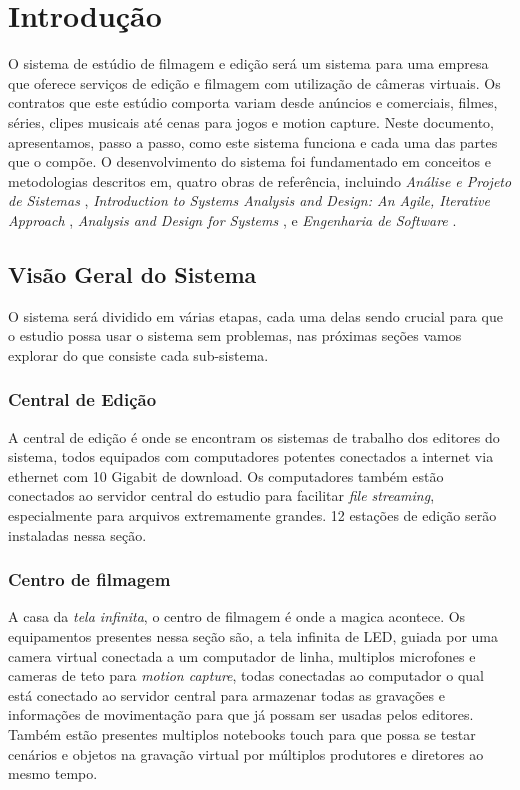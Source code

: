 
\chapter{Introdu\c{c}\~{a}o}

O sistema de estúdio de filmagem e edição será um sistema para uma empresa que oferece serviços de edição e filmagem com utilização de câmeras virtuais. Os contratos que este estúdio comporta variam desde anúncios e comerciais, filmes, séries, clipes musicais até cenas para jogos e motion capture. Neste documento, apresentamos, passo a passo, como este sistema funciona e cada uma das partes que o compõe. O desenvolvimento do sistema foi fundamentado em conceitos e metodologias descritos em, quatro obras de referência, incluindo \textit{Análise e Projeto de Sistemas} \cite{Dennis2014}, \textit{Introduction to Systems Analysis and Design: An Agile, Iterative Approach} \cite{Satzinger2012}, \textit{Analysis and Design for Systems} \cite{Shelly2012}, e \textit{Engenharia de Software} \cite{Sommerville2011}.

\section{Visão Geral do Sistema}
O sistema será dividido em várias etapas, cada uma delas sendo crucial para que o estudio possa usar o sistema sem problemas, nas próximas seções vamos explorar do que consiste cada sub-sistema.
  \subsection{Central de Edição}
  A central de edição é onde se encontram os sistemas de trabalho dos editores do sistema, todos equipados com computadores potentes conectados a internet via ethernet com 10 Gigabit de download. Os computadores também estão conectados ao servidor central do estudio para facilitar \textit{file streaming}, especialmente para arquivos extremamente grandes. 12 estações de edição serão instaladas nessa seção.
  \subsection{Centro de filmagem}
  A casa da \textit{tela infinita}, o centro de filmagem é onde a magica acontece. Os equipamentos presentes nessa seção são, a tela infinita de LED, guiada por uma camera virtual conectada a um computador de linha, multiplos microfones e cameras de teto para \textit{motion capture}, todas conectadas ao computador o qual está conectado ao servidor central para armazenar todas as gravações e informações de movimentação para que já possam ser usadas pelos editores. Também estão presentes multiplos notebooks touch para que possa se testar cenários e objetos na gravação virtual por múltiplos produtores e diretores ao mesmo tempo.
